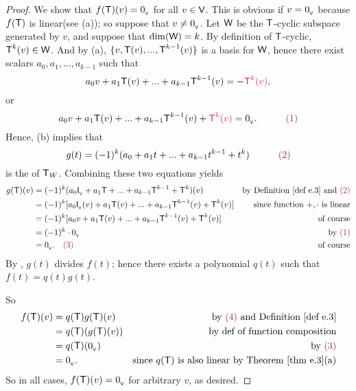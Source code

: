 \begin{proof}
We show that \(f(\textsf{T})(v) = 0_{_{\textsf{V}}}\) for all \(v \in \textsf{V}\).
This is obvious if \(v = 0_{_{\textsf{V}}}\) because \(f(\textsf{T})\) is linear(see (a)); so suppose that \(v \ne 0_{_{\textsf{V}}}\).
Let \(\textsf{W}\) be the \(\textsf{T}\)-cyclic subspace generated by \(v\), and suppose that \(\dim(\textsf{W}) = k\).
By definition of \(\textsf{T}\)-cyclic, \(\textsf{T}^k(v) \in \textsf{W}\).
And by (a), \(\{ v, \textsf{T}(v), ..., \textsf{T}^{k - 1}(v) \}\) is a basis for \(\textsf{W}\), hence there exist scalars \(a_0, a_1, ..., a_{k-1}\) such that
\[
    a_0 v + a_1 \T(v) + ... + a_{k - 1} \T^{k - 1}(v) = -\RED{\T^k(v)},
\]
or
\[
    a_0 v + a_1 \T(v) + ... + a_{k - 1} \T^{k - 1}(v) + \RED{\T^k(v)} = \OV. \quad \quad \quad \MAROON{(1)}
\]
Hence, (b) implies that
\[
    g(t) = (-1)^k (a_0 + a_1 t + ... + a_{k - 1} t^{k - 1} + t^k) \quad \quad \quad \MAROON{(2)}
\]
is the \CPOLY{} of \(\textsf{T}_W\).
Combining these two equations yields
\begin{align*}
    g(\T)(v) & = (-1)^k (a_0 \ITRANV{} + a_1 \T + ... + a_{k - 1} \T^{k - 1} + \T^k)(v) & \text{by \DEF{e.3} and \MAROON{(2)}} \\
        & = (-1)^k [ a_0 \ITRANV{}(v) + a_1\T(v) + ... + a_{k - 1} \T^{k - 1}(v) + \T^k(v) ] & \text{since function \(+, \cdot\) is linear} \\
        & = (-1)^k [ a_0 v + a_1\T(v) + ... + a_{k - 1} \T^{k - 1}(v) + \T^k(v) ] & \text{of course} \\
        & = (-1)^k \cdot \OV & \text{by \MAROON{(1)}} \\
        & = \OV. \quad \MAROON{(3)} & \text{of course}
\end{align*}
By , \(g(t)\) divides \(f(t)\); hence there exists a polynomial \(q(t)\) such that \(f(t) = q(t)g(t)\). 

So
\begin{align*}
    f(\T)(v) & = q(\T)g(\T)(v) & \text{by \MAROON{(4)} and \DEF{e.3}} \\
             & = q(\T)(g(\T)(v)) & \text{by def of function composition} \\
             & = q(\T)(\OV) & \text{by \MAROON{(3)}} \\
             & = \OV. & \text{since \(q(\T)\) is also linear by \THM{e.3}(a)}
\end{align*}
So in all cases, \(f(\textsf{T})(v) = 0_{_{\textsf{V}}}\) for arbitrary \(v\), as desired.
\end{proof}


